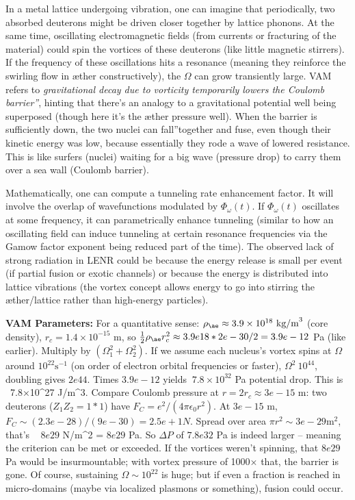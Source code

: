 \documentclass[a4paper, aps,preprint,superscriptaddress, 12pt]{revtex4}
\begin{document}
In a metal lattice undergoing vibration, one can imagine that periodically, two absorbed deuterons might be driven closer together by lattice phonons. At the same time, oscillating electromagnetic fields (from currents or fracturing of the material) could spin the vortices of these deuterons (like little magnetic stirrers). If the frequency of these oscillations hits a resonance (meaning they reinforce the swirling flow in æther constructively), the $\Omega$ can grow transiently large. VAM refers to \textit{\grqq gravitational decay due to vorticity temporarily lowers the Coulomb barrier\textquotedblright}, hinting that there's an analogy to a gravitational potential well being superposed (though here it's the æther pressure well). When the barrier is sufficiently down, the two nuclei can \grqq fall\textquotedblright together and fuse, even though their kinetic energy was low, because essentially they rode a wave of lowered resistance. This is like surfers (nuclei) waiting for a big wave (pressure drop) to carry them over a sea wall (Coulomb barrier).


Mathematically, one can compute a tunneling rate enhancement factor. It will involve the overlap of wavefunctions modulated by $\Phi_\omega(t)$. If $\Phi_\omega(t)$ oscillates at some frequency, it can parametrically enhance tunneling (similar to how an oscillating field can induce tunneling at certain resonance frequencies via the Gamow factor exponent being reduced part of the time). The observed lack of strong radiation in LENR could be because the energy release is small per event (if partial fusion or exotic channels) or because the energy is distributed into lattice vibrations (the vortex concept allows energy to go into stirring the æther/lattice rather than high-energy particles).


\textbf{VAM Parameters:} For a quantitative sense: $\rho_{\ae}\approx3.9\times10^{18}~\text{kg/m}^3$ (core density), $r_c=1.4\times10^{-15}$ m, so $\frac{1}{2}\rho_{\ae}r_c^2 \approx 3.9e18 * 2e-30 /2 = 3.9e-12$ Pa (like earlier). Multiply by $(\Omega_1^2+\Omega_2^2)$. If we assume each nucleus's vortex spins at $\Omega$ around $10^{22}\text{s}^{-1}$ (on order of electron orbital frequencies or faster), $\Omega^2 ~ 10^{44}$, doubling gives $2e44$. Times $3.9e-12$ yields $~7.8\times10^{32}$ Pa potential drop. This is ~7.8×10^27 J/m^3. Compare Coulomb pressure at $r=2r_c \approx3e-15$ m: two deuterons ($Z_1Z_2=1*1$) have $F_C = e^2/(4\pi\epsilon_0 r^2)$. At $3e-15$ m, $F_C\sim (2.3e-28)/ (9e-30) =2.5e+1 N$. Spread over area $\pi r^2 \sim 3e-29 \text{m}^2$, that's ~ $8e29$ N/m^2 = $8e29$ Pa. So $\Delta P$ of $7.8e32$ Pa is indeed larger – meaning the criterion can be met or exceeded. If the vortices weren't spinning, that $8e29$ Pa would be insurmountable; with vortex pressure of 1000× that, the barrier is gone. Of course, sustaining $\Omega \sim10^{22}$ is huge; but if even a fraction is reached in micro-domains (maybe via localized plasmons or something), fusion could occur.
\end{document}
